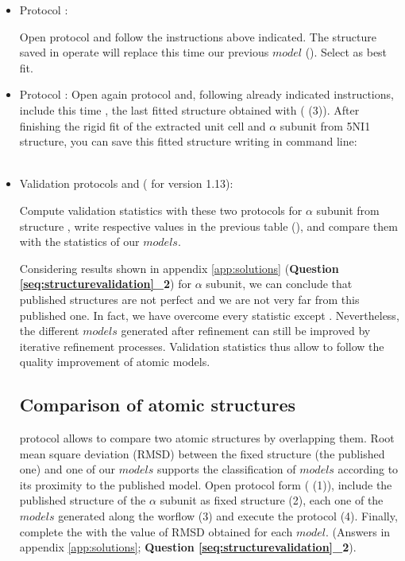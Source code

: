 \begin{itemize}
    \item Protocol :
    
    Open \powerfit protocol and follow the instructions above indicated. The structure saved in \chimera operate will replace this time our previous $model$ (). Select  as best fit.\\
    
    \item Protocol :
    Open again \chimera {} protocol and, following already indicated instructions, include this time , the last fitted structure obtained with \powerfit ( (3)). After finishing the rigid fit of the extracted unit cell and  $\alpha$ subunit from 5NI1 structure, you can save this fitted structure writing in \chimera command line:\\
    \\
    
    \item{Validation protocols  and  ( for \phenix version 1.13)}:
    
    Compute validation statistics with these two protocols for  $\alpha$ subunit from  structure , write respective values in the previous table (), and compare them with the statistics of our $models$.
    
    Considering results shown in appendix \ref{app:solutions} (\textbf{Question \ref{seq:structurevalidation}\_2}) for  $\alpha$ subunit, we can conclude that published structures are not perfect and we are not very far from this published one. In fact, we have overcome every statistic except \ccmask. Nevertheless, the different $models$ generated after \coot refinement can still be improved by iterative refinement processes. Validation statistics thus allow to follow the quality improvement of atomic models.\\

 
  \subsection*{Comparison of atomic structures}
  
  \phenix protocol  allows to compare two atomic structures by overlapping them. Root mean square deviation (RMSD) between the fixed structure (the published one) and one of our $models$ supports the classification of $models$ according to its proximity to the published model. Open \phenix {} protocol form ( (1)), include the published structure of the  $\alpha$ subunit as fixed structure (2), each one of the $models$ generated along the worflow (3) and execute the protocol (4). Finally, complete the  with the value of RMSD obtained for each $model$. (Answers in appendix \ref{app:solutions}; \textbf{Question \ref{seq:structurevalidation}\_2}).
  

\end{itemize}
